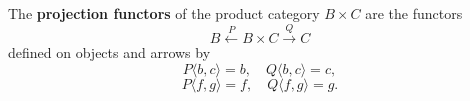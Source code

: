 The \textbf{projection functors} of the product category $B \times C$ are the functors
$$B \xleftarrow{P} B \times C \xrightarrow{Q} C$$
defined on objects and arrows by
$$P\langle b, c \rangle = b, \quad Q\langle b, c \rangle = c,$$
$$P\langle f, g \rangle = f, \quad Q\langle f, g \rangle = g.$$
